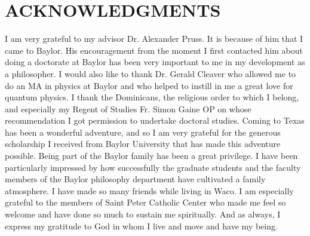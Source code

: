 
\chapter*{ACKNOWLEDGMENTS} %



I am very grateful to my advisor Dr. Alexander Pruss. It is because of him that I came to Baylor. His encouragement from the moment I first contacted him about doing a doctorate at Baylor has been very important to me in my development as a philosopher. I would also like to thank Dr. Gerald Cleaver who allowed me to do an MA in physics at Baylor and who helped to instill in me a great love for quantum physics. I thank the Dominicans, the religious order to which I belong, and especially my Regent of Studies Fr. Simon Gaine OP on whose recommendation I got permission to undertake doctoral studies. Coming to Texas has been a wonderful adventure, and so I am very grateful for the generous scholarship I received from Baylor University that has made this adventure possible. Being part of the Baylor family has been a great privilege. I have been particularly impressed by how successfully the graduate students and the faculty members of the Baylor philosophy department have cultivated a family atmosphere. I have made so many friends while living in Waco. I am especially grateful to the members of Saint Peter Catholic Center who made me feel so welcome and have done so much to sustain me spiritually. And as always, I express my gratitude to God in whom I live and move and have my being.



